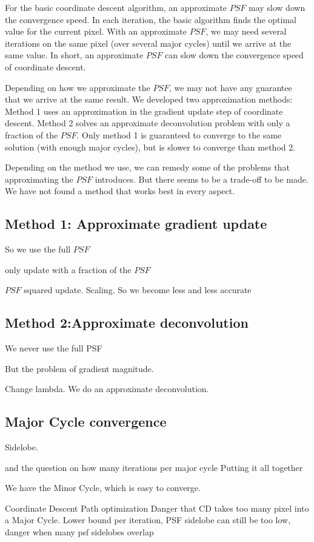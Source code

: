 For the basic coordinate descent algorithm, an approximate $PSF$ may slow down the convergence speed. In each iteration, the basic algorithm finds the optimal value for the current pixel. With an approximate $PSF$, we may need several iterations on the same pixel (over several major cycles) until we arrive at the same value. In short, an approximate $PSF$ can slow down the convergence speed of coordinate descent.

Depending on how we approximate the $PSF$, we may not have any guarantee that we arrive at the same result. We developed two approximation methods: Method 1 uses an approximation in the gradient update step of coordinate descent. Method 2 solves an approximate deconvolution problem with only a fraction of the $PSF$. Only method 1 is guaranteed to converge to the same solution (with enough major cycles), but is slower to converge than method 2.

Depending on the method we use, we can remedy some of the problems that approximating the $PSF$ introduces. But there seems to be a trade-off to be made. We have not found a method that works best in every aspect.

\subsection{Method 1: Approximate gradient update}

So we use the full $PSF$

only update with a fraction of the $PSF$

$PSF$ squared update. Scaling.
So we become less and less accurate


\subsection{Method 2:Approximate deconvolution}

We never use the full PSF

But the problem of gradient magnitude. 

Change lambda. We do an approximate deconvolution. 


\subsection{Major Cycle convergence}\label{gradients:pathreg}

Sidelobe.

\cite{clark1980efficient} and the question on how many iterations per major cycle
Putting it all together

We have the Minor Cycle, which is easy to converge.

Coordinate Descent Path optimization \cite{friedman2010regularization}
Danger that CD takes too many pixel into a Major Cycle. Lower bound per iteration, PSF sidelobe
can still be too low, danger when many psf sidelobes overlap